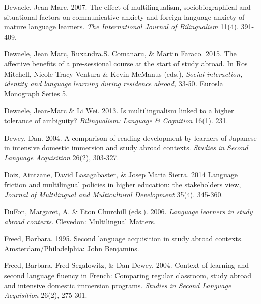 \begin{styleStandard}
Dewaele, Jean Marc. 2007. The effect of multilingualism, sociobiographical and situational factors on communicative anxiety and foreign language anxiety of mature language learners. \textit{The International Journal of Bilingualism }11(4). 391-409.
\end{styleStandard}


\begin{styleStandard}
Dewaele, Jean Marc, Ruxandra.S. Comanaru, \& Martin Faraco. 2015. The affective benefits of a pre-sessional course at the start of study abroad. In Ros Mitchell, Nicole Tracy-Ventura \& Kevin McManus (eds.), \textit{Social interaction, identity and language learning during residence abroad, }33-50\textit{. }Eurosla Monograph Series 5.
\end{styleStandard}


\begin{styleStandard}
Dewaele, Jean-Marc \& Li Wei. 2013. Is multilingualism linked to a higher tolerance of ambiguity? \textit{Bilingualism: Language \& Cognition} 16(1). 231.
\end{styleStandard}


\begin{styleStandard}
Dewey, Dan. 2004. A comparison of reading development by learners of Japanese in intensive domestic immersion and study abroad contexts. \textit{Studies in Second Language Acquisition }26(2), 303-327.
\end{styleStandard}


\begin{styleStandard}
Doiz, Aintzane, David Lasagabaster, \& Josep Maria Sierra. 2014 Language friction and multilingual policies in higher education: the stakeholders{\textquotesingle} view, \textit{Journal of Multilingual and Multicultural Development }35(4). 345-360.
\end{styleStandard}


\begin{styleStandard}
DuFon, Margaret, A. \& Eton Churchill (eds.). 2006. \textit{Language learners in study abroad contexts}. Clevedon: Multilingual Matters.
\end{styleStandard}


\begin{styleStandard}
Freed, Barbara. 1995. Second language acquisition in study abroad contexts. Amsterdam/Philadelphia: John Benjamins. 
\end{styleStandard}


\begin{styleStandard}
Freed, Barbara, Fred Segalowitz, \& Dan Dewey. 2004. Context of learning and second language fluency in French: Comparing regular classroom, study abroad and intensive domestic immersion programs. \textit{Studies in Second Language Acquisition} 26(2), 275-301.
\end{styleStandard}


